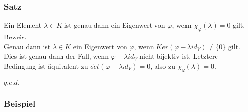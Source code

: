 \documentclass[a4paper]{article}
\newcommand{\ul}{\underline}
\renewcommand{\qed}{\begin{flushright}
\ul{\(q.e.d.\)}
\end{flushright}}
\let\phi\varphi
\begin{document}
\subsubsection{Satz}
Ein Element \(\lambda \in K\) ist genau dann ein Eigenwert von \(\phi\), wenn \(\chi_{\phi}(\lambda)=0\) gilt.\\
\ul{Beweis:}\\
Genau dann ist \(\lambda \in K\) ein Eigenwert von \(\phi\), wenn \(Ker(\phi-\lambda id_V)\neq \{0\}\) gilt. Dies ist genau dann der Fall, wenn \(\phi-\lambda id_V\) nicht bijektiv ist. Letztere Bedingung ist äquivalent zu \(det(\phi-\lambda id_V)=0\), also zu \(\chi_\phi(\lambda)=0\).
\qed
\subsubsection{Beispiel}
\end{document}
